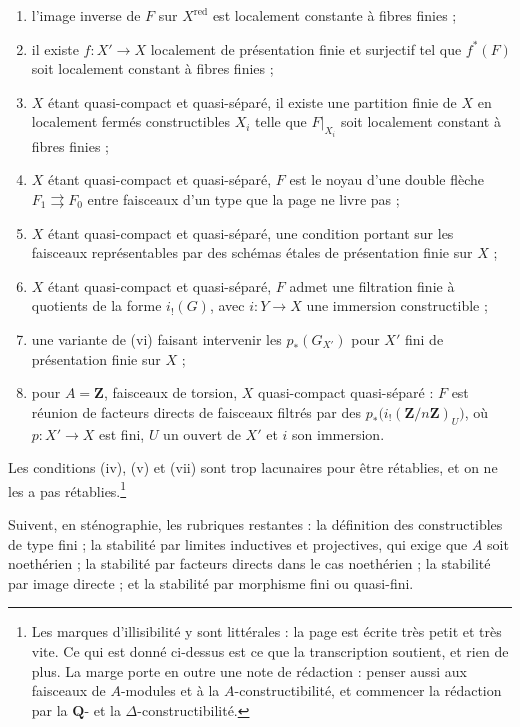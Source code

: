 \documentclass[11pt,a4paper]{article}
\begin{document}
\begin{enumerate}
\item[(i)] l'image inverse de $F$ sur $X^{\mathrm{red}}$ est localement
constante à fibres finies ;
\item[(ii)] il existe $f : X' \to X$ localement de présentation finie et
surjectif tel que $f^{*}(F)$ soit localement constant à fibres finies ;
\item[(iii)] $X$ étant quasi-compact et quasi-séparé, il existe une partition
finie de $X$ en localement fermés constructibles $X_{i}$ telle que
$F|_{X_{i}}$ soit localement constant à fibres finies ;
\item[(iv)] $X$ étant quasi-compact et quasi-séparé, $F$ est le noyau d'une
double flèche $F_{1} \rightrightarrows F_{0}$ entre faisceaux d'un type que la
page ne livre pas ;
\item[(v)] $X$ étant quasi-compact et quasi-séparé, une condition portant sur
les faisceaux représentables par des schémas étales de présentation finie sur
$X$ ;
\item[(vi)] $X$ étant quasi-compact et quasi-séparé, $F$ admet une filtration
finie à quotients de la forme $i_{!}(G)$, avec $i : Y \to X$ une immersion
constructible ;
\item[(vii)] une variante de (vi) faisant intervenir les $p_{*}(G_{X'})$ pour
$X'$ fini de présentation finie sur $X$ ;
\item[(viii)] pour $A = \mathbf{Z}$, faisceaux de torsion, $X$ quasi-compact
quasi-séparé : $F$ est réunion de facteurs directs de faisceaux filtrés par des
$p_{*}\bigl( i_{!}(\mathbf{Z}/n\mathbf{Z})_{U} \bigr)$, où $p : X' \to X$ est
fini, $U$ un ouvert de $X'$ et $i$ son immersion.
\end{enumerate}

Les conditions (iv), (v) et (vii) sont trop lacunaires pour être rétablies, et
on ne les a pas rétablies.\footnote{Les marques d'illisibilité y sont
littérales : la page est écrite très petit et très vite. Ce qui est donné
ci-dessus est ce que la transcription soutient, et rien de plus. La marge porte
en outre une note de rédaction : penser aussi aux faisceaux de $A$-modules et à
la $A$-constructibilité, et commencer la rédaction par la $\mathbf{Q}$- et la
$\Delta$-constructibilité.}

Suivent, en sténographie, les rubriques restantes : la définition des
constructibles de type fini ; la stabilité par limites inductives et
projectives, qui exige que $A$ soit noethérien ; la stabilité par facteurs
directs dans le cas noethérien ; la stabilité par image directe ; et la
stabilité par morphisme fini ou quasi-fini.
\end{document}
